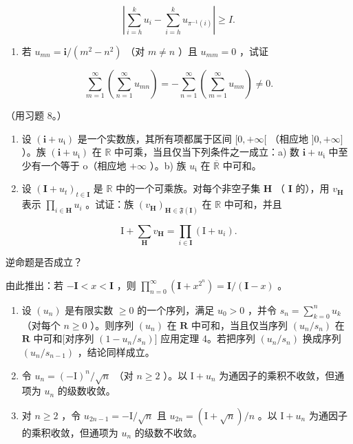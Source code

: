 \[
\left| \sum_ {i = h} ^ {k} u _ {i} - \sum_ {i = h} ^ {k} u _ {\pi^ {- 1} (i)} \right| \geqslant I.
\]

\begin{enumerate}
\def\labelenumi{\arabic{enumi})}
\setcounter{enumi}{16}
\tightlist
\item
若 \(u_{mn} = \mathbf{i} / (m^2 - n^2)\) （对 \(m \neq n\) ）且 \(u_{mm} = 0\) ，试证
\end{enumerate}

\[
\sum_ {m = 1} ^ {\infty} \left(\sum_ {n = 1} ^ {\infty} u _ {m n}\right) = - \sum_ {n = 1} ^ {\infty} \left(\sum_ {m = 1} ^ {\infty} u _ {m n}\right) \neq 0.
\]

（用习题 8。）

\begin{enumerate}
\def\labelenumi{\arabic{enumi})}
\setcounter{enumi}{17}
\item
设 \((\mathbf{i} + u_{\mathfrak{i}})\) 是一个实数族，其所有项都属于区间 \([0, +\infty[\) （相应地 \(]0, +\infty]\) ）。族 \((\mathbf{i} + u_{\mathfrak{i}})\) 在 \(\mathbb{R}\) 中可乘，当且仅当下列条件之一成立：a) 数 \(\mathbf{i} + u_{\mathfrak{i}}\) 中至少有一个等于 o（相应地 \(+\infty\) ）。b) 族 \(u_{\mathfrak{i}}\) 在 \(\overline{\mathbb{R}}\) 中可和。
\item
设 \((\mathbf{I} + u_{t})_{t\in \mathbf{I}}\) 是 \(\mathbb{R}\) 中的一个可乘族。对每个非空子集 \(\mathbf{H}\) （ \(\mathbf{I}\) 的），用 \(v_{\mathbf{H}}\) 表示 \(\prod_{i\in \mathbf{H}}u_i\) 。试证：族 \((v_{\mathbf{H}})_{\mathbf{H}\in \mathfrak{F}(\mathbf{I})}\) 在 \(\mathbb{R}\) 中可和，并且
\end{enumerate}

\[
\mathrm{I} + \sum_ {\mathbf {H}} v _ {\mathbf {H}} = \prod_ {i \in \mathbf {I}} (\mathrm{I} + u _ {i}).
\]

逆命题是否成立？

由此推出：若 \(-\mathbf{I} < x < \mathbf{I}\) ，则 \(\prod_{n=0}^{\infty} (\mathbf{I} + x^{2^n}) = \mathbf{I} / (\mathbf{I} - x)\) 。

\begin{enumerate}
\def\labelenumi{\arabic{enumi})}
\setcounter{enumi}{19}
\item
设 \((u_n)\) 是有限实数 \(\geqslant 0\) 的一个序列，满足 \(u_0 > 0\) ，并令 \(s_n = \sum_{k=0}^{n} u_k\) （对每个 \(n \geqslant 0\) ）。则序列 \((u_n)\) 在 \(\mathbf{R}\) 中可和，当且仅当序列 \((u_n / s_n)\) 在 \(\mathbf{R}\) 中可和{[}对序列 \((1 - u_n / s_n)]\) 应用定理 4。若把序列 \((u_n / s_n)\) 换成序列 \((u_n / s_{n-1})\) ，结论同样成立。
\item
令 \(u_{n} = (-\mathrm{I})^{n} / \sqrt{n}\) （对 \(n \geqslant 2\) ）。以 \(\mathrm{I} + u_{n}\) 为通因子的乘积不收敛，但通项为 \(u_{n}\) 的级数收敛。
\item
对 \(n \geqslant 2\) ，令 \(u_{2n-1} = -\mathrm{I}/\sqrt{n}\) 且 \(u_{2n} = (\mathrm{I} + \sqrt{n})/n\) 。以 \(\mathrm{I} + u_n\) 为通因子的乘积收敛，但通项为 \(u_n\) 的级数不收敛。
\end{enumerate}

